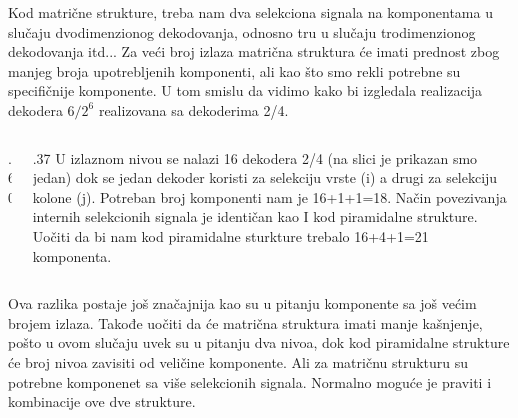 \begin{frame}[t,label=03-s010]
\gusttekst
\fontsize{9}{9.5}\selectfont
\setlength{\parskip}{1pt}
Kod matrične strukture, treba nam dva selekciona signala na komponentama u slučaju dvodimenzionog dekodovanja, odnosno tru u slučaju trodimenzionog dekodovanja itd... Za veći broj izlaza matrična struktura će imati prednost zbog manjeg broja upotrebljenih komponenti, ali kao što smo rekli potrebne su specifičnije komponente. U tom smislu da vidimo kako bi izgledala realizacija dekodera \(6/2^6\) realizovana sa dekoderima 2/4.
\begin{columns}[c,onlytextwidth]
\begin{column}{.60\textwidth}\centering

\end{column}
\begin{column}{.37\textwidth}
U izlaznom nivou se nalazi 16 dekodera 2/4 (na slici je prikazan smo jedan) dok se jedan dekoder koristi za selekciju vrste (i) a drugi za selekciju kolone (j). Potreban broj komponenti nam je 16+1+1=18. Način povezivanja internih selekcionih signala je identičan kao I kod piramidalne strukture. Uočiti da bi nam kod piramidalne sturkture trebalo 16+4+1=21 komponenta.
\end{column}
\end{columns}

Ova razlika postaje još značajnija kao su u pitanju komponente sa još većim brojem izlaza. Takođe uočiti da će matrična struktura imati manje kašnjenje, pošto u ovom slučaju uvek su u pitanju dva nivoa, dok kod piramidalne strukture će broj nivoa zavisiti od veličine komponente. Ali za matričnu strukturu su potrebne komponenet sa više selekcionih signala. Normalno moguće je praviti i kombinacije ove dve strukture.

\end{frame}
